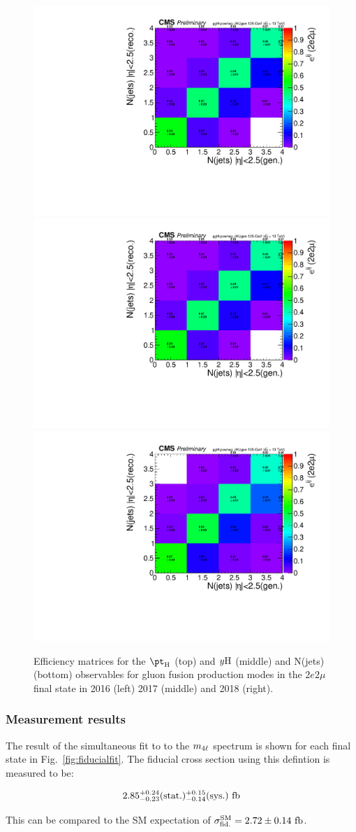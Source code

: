 \begin{figure}[!h]
	\includegraphics[width=0.32\linewidth]{Figures/results/fiducial/2016/eff2d_ggH_powheg_JHUgen_125_njets_pt30_eta2p5_2e2mu.pdf}
	\includegraphics[width=0.32\linewidth]{Figures/results/fiducial/2017/eff2d_ggH_powheg_JHUgen_125_njets_pt30_eta2p5_2e2mu.pdf}
	\includegraphics[width=0.32\linewidth]{Figures/results/fiducial/2018/eff2d_ggH_powheg_JHUgen_125_njets_pt30_eta2p5_2e2mu.pdf} 
	
	\caption{Efficiency matrices for the $\pt_{\rm H}$ (top) and $y{\rm H}$ (middle) and N(jets) (bottom) observables for gluon fusion production
		modes in the $2e2\mu$ final state in 2016 (left) 2017 (middle) and 2018 (right). \label{fig:eff2d}}
\end{figure}


\subsubsection{Measurement results}

The result of the simultaneous fit to to the $m_{4\ell}$ spectrum is shown for each final state in Fig.~\ref{fig:fiducialfit}. The fiducial cross section using this defintion is measured to be:

\begin{eqnarray}
\label{eqn:fidresult}
2.85^{+0.24}_{-0.23}({\rm stat.})^{+0.15}_{-0.14}({\rm sys.})~{\rm fb}
\end{eqnarray}

This can be compared to the SM expectation of $\sigma_{{\rm fid.}}^{\rm SM}=2.72\pm0.14~{\rm fb}$.

